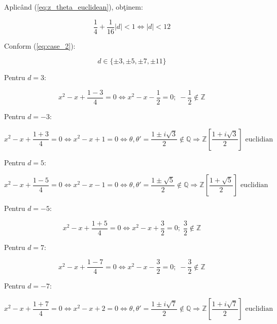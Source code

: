 \documentclass[12t]{article}
\begin{document}
Aplicând (\ref{eq:z_theta_euclidean}), obţinem:

\begin{equation}
    \frac{1}{4} + \frac{1}{16}|d| < 1 \Leftrightarrow |d| < 12
\end{equation}

Conform (\ref{eq:case_2}):

\begin{equation*}
    d \in \{\pm 3, \pm 5, \pm 7, \pm 11\}
\end{equation*}

Pentru $d = 3$:

\begin{equation*}
    x^2 - x + \frac{1 - 3}{4} = 0
    \Leftrightarrow x^2 - x - \frac{1}{2} = 0; \; -\frac{1}{2} \notin \mathbb{Z}
\end{equation*}

Pentru $d = -3$:

\begin{equation}
    x^2 - x + \frac{1 + 3}{4} = 0
    \Leftrightarrow x^2 - x + 1 = 0
    \Leftrightarrow \theta, \theta' = \frac{1 \pm i\sqrt{3}}{2} \notin \mathbb{Q}
    \Rightarrow \boxed{\mathbb{Z}\left[\frac{1 + i\sqrt{3}}{2}\right] \text{ euclidian}}
\end{equation}

Pentru $d = 5$:

\begin{equation}
    x^2 - x + \frac{1 - 5}{4} = 0
    \Leftrightarrow x^2 - x - 1 = 0
    \Leftrightarrow \theta, \theta' = \frac{1 \pm \sqrt{5}}{2} \notin \mathbb{Q}
    \Rightarrow \boxed{\mathbb{Z}\left[\frac{1 + \sqrt{5}}{2}\right] \text{ euclidian}}
\end{equation}

Pentru $d = -5$:

\begin{equation*}
    x^2 - x + \frac{1 + 5}{4} = 0
    \Leftrightarrow x^2 - x + \frac{3}{2} = 0; \; \frac{3}{2} \notin \mathbb{Z}
\end{equation*}

Pentru $d = 7$:

\begin{equation*}
    x^2 - x + \frac{1 - 7}{4} = 0
    \Leftrightarrow x^2 - x - \frac{3}{2} = 0; \; -\frac{3}{2} \notin \mathbb{Z}
\end{equation*}

Pentru $d = -7$:

\begin{equation}
    x^2 - x + \frac{1 + 7}{4} = 0
    \Leftrightarrow x^2 - x + 2 = 0
    \Leftrightarrow \theta, \theta' = \frac{1 \pm i\sqrt{7}}{2} \notin \mathbb{Q}
    \Rightarrow \boxed{\mathbb{Z}\left[\frac{1 + i\sqrt{7}}{2}\right] \text{ euclidian}}
\end{equation}
\end{document}
